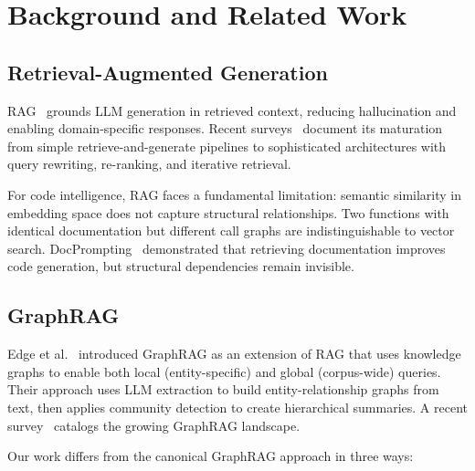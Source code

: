 \documentclass[11pt,letterpaper]{article}
\begin{document}
\section{Background and Related Work}
\label{sec:background}

\subsection{Retrieval-Augmented Generation}

RAG~\cite{lewis2020rag} grounds LLM generation in retrieved context,
reducing hallucination and enabling domain-specific responses. Recent
surveys~\cite{gao2024rag_survey} document its maturation from simple
retrieve-and-generate pipelines to sophisticated architectures with
query rewriting, re-ranking, and iterative retrieval.

For code intelligence, RAG faces a fundamental limitation: semantic
similarity in embedding space does not capture structural relationships.
Two functions with identical documentation but different call graphs
are indistinguishable to vector search. DocPrompting~\cite{zhou2022docprompting}
demonstrated that retrieving documentation improves code generation, but
structural dependencies remain invisible.

\subsection{GraphRAG}

Edge et al.~\cite{edge2024graphrag} introduced GraphRAG as an extension
of RAG that uses knowledge graphs to enable both local (entity-specific)
and global (corpus-wide) queries. Their approach uses LLM extraction to
build entity-relationship graphs from text, then applies community
detection to create hierarchical summaries. A recent
survey~\cite{peng2024graph_rag_survey} catalogs the growing GraphRAG
landscape.

Our work differs from the canonical GraphRAG approach in three ways:
\end{document}
